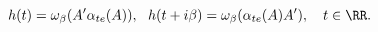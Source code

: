 \begin{equation}
h(t) = \omega_\beta(A^\prime \alpha_{te}(A)), 
\ \ h(t+i\beta) = \omega_\beta(\alpha_{te}(A) A^\prime), 
\quad t \in \RR.
\end{equation}

